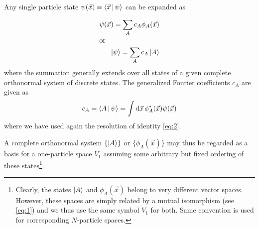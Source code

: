 \documentclass{book}
\renewcommand{\braket}[1]{\Braket{#1}}
\renewcommand{\ket}[1]{\Ket{#1}}
\newcommand{\de}[1]{\mathrm{d}{#1}\,}
\begin{document}
Any single particle state $\psi(\vec{x})\equiv \braket{\vec{x}|\psi}$ can be expanded as

\begin{subequations}
    \begin{align}
        \psi(\vec{x}) = \sum_Ac_A\phi_A(\vec{x})\\
        \intertext{or}
        \ket{\psi}=\sum_A c_A\ket{A}
    \end{align}
\end{subequations}
where the summation generally extends over all states of a given complete orthonormal system of discrete states. The generalized Fourier coefficients $c_A$ are given as
\begin{align}
c_A=\braket{A|\psi}=\int{\de{\vec{x}}}\phi_A^*(\vec{x})\psi(\vec{x})
\end{align}
where we have used again the resolution of identity \eqref{eq:2}.  

A complete orthonormal system $\{\ket{A}\}$ or $\{\phi_A(\vec{x})\}$ may thus be regarded as a basis for a one-particle space $V_1$ assuming some arbitrary but fixed ordering of these states\footnote{
    Clearly, the states $\ket{A}$ and $\phi_A(\vec{x})$ belong to very different vector spaces. However, these spaces are simply related by a mutual isomorphism (see \eqref{eq:1}) and we thus use the same symbol $V_1$ for both. Same convention is used for corresponding $N$-particle spaces.
    }.
\end{document}
